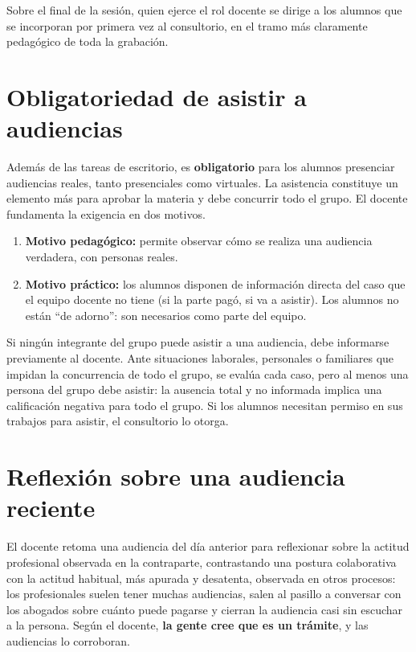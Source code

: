 \documentclass[12pt,oneside]{book}
\begin{document}
Sobre el final de la sesi\'on, quien ejerce el rol docente se dirige a los alumnos que se incorporan por primera vez al consultorio, en el tramo m\'as claramente pedag\'ogico de toda la grabaci\'on.

\section{Obligatoriedad de asistir a audiencias}

Adem\'as de las tareas de escritorio, es \textbf{obligatorio} para los alumnos presenciar audiencias reales, tanto presenciales como virtuales. La asistencia constituye un elemento m\'as para aprobar la materia y debe concurrir todo el grupo. El docente fundamenta la exigencia en dos motivos.

\begin{enumerate}
    \item \textbf{Motivo pedag\'ogico:} permite observar c\'omo se realiza una audiencia verdadera, con personas reales.
    \item \textbf{Motivo pr\'actico:} los alumnos disponen de informaci\'on directa del caso que el equipo docente no tiene (si la parte pag\'o, si va a asistir). Los alumnos no est\'an ``de adorno'': son necesarios como parte del equipo.
\end{enumerate}

\begin{important}
Si ning\'un integrante del grupo puede asistir a una audiencia, debe informarse previamente al docente. Ante situaciones laborales, personales o familiares que impidan la concurrencia de todo el grupo, se eval\'ua cada caso, pero al menos una persona del grupo debe asistir: la ausencia total y no informada implica una calificaci\'on negativa para todo el grupo. Si los alumnos necesitan permiso en sus trabajos para asistir, el consultorio lo otorga.
\end{important}

\section{Reflexi\'on sobre una audiencia reciente}

El docente retoma una audiencia del d\'ia anterior para reflexionar sobre la actitud profesional observada en la contraparte, contrastando una postura colaborativa con la actitud habitual, m\'as apurada y desatenta, observada en otros procesos: los profesionales suelen tener muchas audiencias, salen al pasillo a conversar con los abogados sobre cu\'anto puede pagarse y cierran la audiencia casi sin escuchar a la persona. Seg\'un el docente, \textbf{la gente cree que es un tr\'amite}, y las audiencias lo corroboran.
\end{document}
